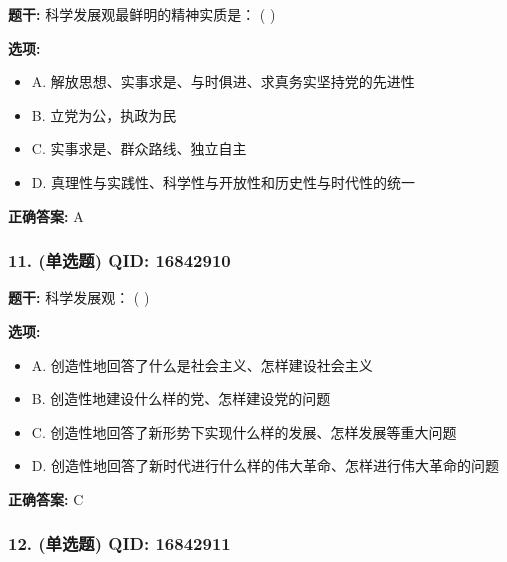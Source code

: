 \documentclass[12pt,UTF8]{ctexart}
\begin{document}
\textbf{题干:}
科学发展观最鲜明的精神实质是： ( )

\textbf{选项:}
\begin{itemize}[leftmargin=*]

  \item A. 解放思想、实事求是、与时俱进、求真务实坚持党的先进性

  \item B. 立党为公，执政为民

  \item C. 实事求是、群众路线、独立自主

  \item D. 真理性与实践性、科学性与开放性和历史性与时代性的统一

\end{itemize}

\textbf{正确答案:}
A

\vspace{0.3em}\hrulefill\vspace{0.7em}

\subsubsection*{11. (单选题) \small QID: 16842910}

\textbf{题干:}
科学发展观： ( )

\textbf{选项:}
\begin{itemize}[leftmargin=*]

  \item A. 创造性地回答了什么是社会主义、怎样建设社会主义

  \item B. 创造性地建设什么样的党、怎样建设党的问题

  \item C. 创造性地回答了新形势下实现什么样的发展、怎样发展等重大问题

  \item D. 创造性地回答了新时代进行什么样的伟大革命、怎样进行伟大革命的问题

\end{itemize}

\textbf{正确答案:}
C

\vspace{0.3em}\hrulefill\vspace{0.7em}

\subsubsection*{12. (单选题) \small QID: 16842911}
\end{document}
